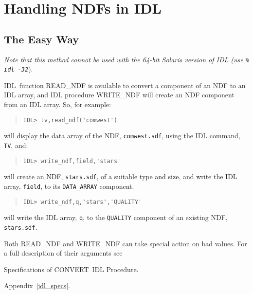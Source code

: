 \documentclass[twoside,11pt]{article}
\newcommand{\htmladdnormallink}[2]{#1}
\newcommand{\htmlref}[2]{#1}
\newcommand{\latex}[1]{#1}
\newcommand{\xref}[3]{#1}
\newcommand{\BCONVERT}{{\normalsize CONVERT}}
\newcommand{\IDLURL}{http://www.rsinc.com/idl/}
\newcommand{\IDLref}{\htmladdnormallink{IDL}{\IDLURL}}
\begin{document}
\newpage
\section{\label{app_idl}Handling NDFs in \IDLref}
\subsection{\label{idl_easy}The Easy Way}
\emph{Note that this method cannot be used with the 64-bit Solaris version of
IDL (use \texttt{\% idl -32}}).

\IDLref\
function 
\htmlref{READ\_NDF}{READ_NDF}
is available to convert a component of an NDF to an IDL array, and IDL 
procedure 
\htmlref{WRITE\_NDF}{WRITE_NDF}
will create an NDF component from an IDL array. So, for example:
\begin{quote} \begin{verbatim}
IDL> tv,read_ndf('comwest')
\end{verbatim} \end{quote}
will display the data array of the NDF, \texttt{comwest.sdf}, using the IDL
command, \texttt{TV}, and:
\begin{quote} \begin{verbatim}
IDL> write_ndf,field,'stars'
\end{verbatim} \end{quote}
will create an NDF, \texttt{stars.sdf}, of a suitable type and size, and write
the IDL array, \texttt{field}, to its \texttt{DATA\_ARRAY} component.
\begin{quote} \begin{verbatim}
IDL> write_ndf,q,'stars','QUALITY'
\end{verbatim} \end{quote}
will write the IDL array, \texttt{q}, to the \texttt{QUALITY} component of an 
existing NDF, \texttt{stars.sdf}.

Both READ\_NDF and WRITE\_NDF can take special action on \xref{bad
values}{sun95}{se_masking}. For a full description of their arguments see 
\begin{htmlonly}
\htmlref{Specifications of \BCONVERT\ IDL Procedure}{idl_specs}.
\end{htmlonly}
\latex{Appendix~\ref{idl_specs}.}
\end{document}
